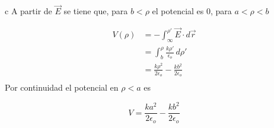 \begin{solucion}{4}
\begin{itemize}
    \end{itemize}
    
\ics c A partir de $\Vec{E}$ se tiene que, para $b<\rho$ el potencial es 0, para $a<\rho <b$

\begin{equation}
\begin{split}
    V(\rho) &= -\int^{\rho'}_\infty\Vec{E}\cdot d\Vec{r}\\
    &= \int^{\rho}_b\frac{k\rho'}{\epsilon_o}\,d\rho'\\
    &= \frac{k\rho^2}{2\epsilon_o}-\frac{kb^2}{2\epsilon_o}\\
\end{split}
\nonumber
\end{equation}
\bigbreak
Por continuidad el potencial en $\rho <a$ es

\[V = \frac{ka^2}{2\epsilon_o}-\frac{kb^2}{2\epsilon_o} \]


\end{solucion}
\bigbreak
\bigbreak
